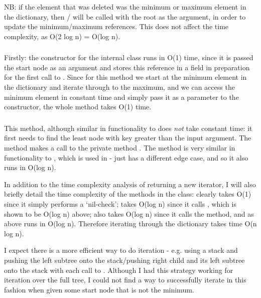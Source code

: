 NB: if the element that was deleted was the minimum or maximum element in the dictionary, then / will be called with the root as the argument, in order to update the minimum/maximum references. This does not affect the time complexity, as O(2 log n) = O(log n).

\subsubsection{}
Firstly: the constructor for the internal class  runs in O(1) time, since it is passed the start node as an argument and stores this reference in a field in preparation for the first call to . Since for this method we start at the minimum element in the dictionary and iterate through to the maximum, and we can access the minimum element in constant time and simply pass it as a parameter to the  constructor, the whole method takes O(1) time.

\subsubsection{}
This method, although similar in functionality to  does \textit{not} take constant time: it first needs to find the least node with key greater than the input argument. The method makes a call to the private method . The method  is very similar in functionality to , which is used in  -  just has a different edge case, and so it also runs in O(log n).

In addition to the time complexity analysis of returning a new iterator, I will also briefly detail the time complexity of the methods in the  class: clearly  takes O(1) since it simply performs a `nil-check';  takes O(log n) since it calls , which is shown to be O(log n) above;  also takes O(log n) since it calls the  method, and as above  runs in O(log n). Therefore iterating through the dictionary takes time O(n log n).

I expect there is a more efficient way to do iteration - e.g. using a stack and pushing the left subtree onto the stack/pushing right child and its left subtree onto the stack with each call to . Although I had this strategy working for iteration over the full tree, I could not find a way to successfully iterate in this fashion when given some start node that is not the minimum.

